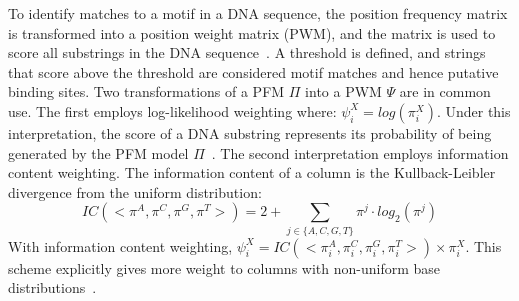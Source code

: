 To identify matches to a motif in a DNA sequence, the position frequency matrix is transformed into a position
weight matrix (PWM), and the matrix is used to score all substrings in the DNA sequence~\citep{Stormo2000}.  A threshold is defined, and
strings that score above the threshold are considered motif matches and hence putative binding sites.  Two
transformations of a PFM \begin{math}\Pi\end{math} into a PWM \begin{math}\Psi\end{math} are in common use.
The first employs log-likelihood weighting where: $\psi^X_i = log(\pi^X_i)$.  Under this
interpretation, the score of a DNA substring represents its probability of being generated by the PFM model $\Pi$~\citep{Stormo2000}.
The second interpretation employs information content weighting.  The information content of a column is the Kullback-Leibler
divergence from the uniform distribution:
\begin{equation}
IC(<\pi^A,\pi^C,\pi^G,\pi^T>) = 2 + \sum_{j \in \{A,C,G,T\} } \pi^j \cdot log_2(\pi^j)
\end{equation}
With information content weighting, $\psi^X_i = IC(<\pi^A_i,\pi^C_i,\pi^G_i,\pi^T_i>) \times \pi^X_i$.
This scheme explicitly gives more weight to columns with non-uniform base distributions~\citep{Kel2003}.


